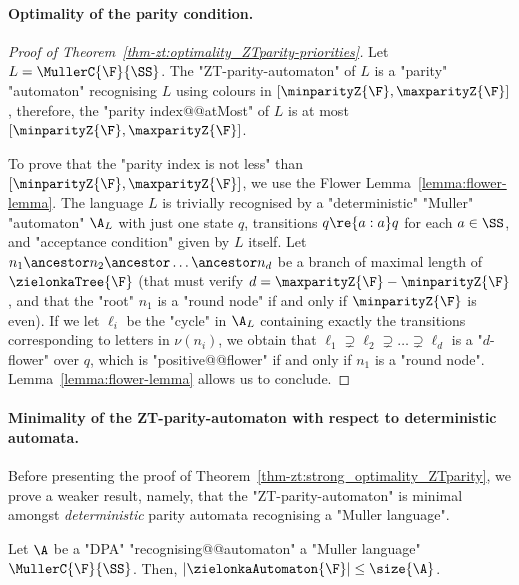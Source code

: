 \documentclass{theoretics}
\begin{document}
\paragraph*{Optimality of the parity condition.}
\begin{proof}[Proof of Theorem~\ref{thm-zt:optimality_ZTparity-priorities}]
	Let $L= \MullerC{\F}{\SS}$.
	The "ZT-parity-automaton" of $L$ is a "parity" "automaton" recognising $L$ using colours in $[\minparityZ{\F}, \maxparityZ{\F}]$, therefore, the "parity index@@atMost" of $L$ is at most $[\minparityZ{\F}, \maxparityZ{\F}]$.
	
	To prove that the "parity index is not less" than $[\minparityZ{\F}, \maxparityZ{\F}]$, we use the Flower Lemma~\ref{lemma:flower-lemma}. The language $L$ is trivially recognised by a "deterministic" "Muller" "automaton" $\A_L$ with just one state $q$, transitions $q\re{a:a}q$ for each $a\in \SS$, and "acceptance condition" given by $L$ itself. Let $n_1\ancestor n_2\ancestor \dots \ancestor n_d$ be a branch of maximal length of $\zielonkaTree{\F}$ (that must verify $d= \maxparityZ{\F} - \minparityZ{\F}$, and that the "root" $n_1$ is a "round node" if and only if $\minparityZ{\F}$ is even). If we let $\ell_i$ be the "cycle" in $\A_L$ containing exactly the transitions corresponding to letters in $\nu(n_i)$, we obtain that $\ell_1\supsetneq \ell_2\supsetneq \dots \supsetneq \ell_d$ is a "$d$-flower" over $q$, which is "positive@@flower" if and only if  $n_1$ is a "round node". Lemma~\ref{lemma:flower-lemma} allows us to conclude.
\end{proof}


\paragraph*{Minimality of the ZT-parity-automaton with respect to deterministic automata.}

Before presenting the proof of Theorem~\ref{thm-zt:strong_optimality_ZTparity}, we prove a weaker result, namely, that the "ZT-parity-automaton" is minimal amongst \emph{deterministic} parity automata recognising a "Muller language".


\begin{theorem}\label{thm-zt:weak_optimality_ZTparity}
	Let $\A$ be a "DPA"  "recognising@@automaton" a "Muller language" $\MullerC{\F}{\SS}$. Then, $|\zielonkaAutomaton{\F}| \leq \size{\A}$.
\end{theorem}
\end{document}
